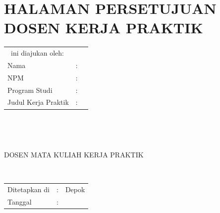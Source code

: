 %
%
%

\chapter*{HALAMAN PERSETUJUAN DOSEN KERJA PRAKTIK}
\thispagestyle{empty}
\vspace*{0.4cm}
\noindent

\noindent
\begin{tabular}{ll p{9cm}}
	\multicolumn{3}{l}{\type~ini diajukan oleh:}  \\
	Nama&: & \penulisSatu \\
	NPM&: & \npmSatu \\
	Program Studi&: & \programSatu \\
	Judul Kerja Praktik&: & \judul \\
\end{tabular} \\

\vspace*{1.0cm}

\noindent {}\\[0.2cm]

\begin{center}
	DOSEN MATA KULIAH KERJA PRAKTIK\\[3cm]
\end{center}

\begin{center}
	\underline{\pembimbingSatu}\\[0.1cm]
\end{center}

\vspace*{2.0cm}

\begin{tabular}{ll l}
	Ditetapkan di&: & Depok\\
	Tanggal&: & \tanggalLulus \\
\end{tabular}

\newpage
